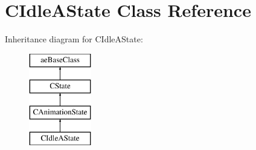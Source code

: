 \hypertarget{class_c_idle_a_state}{}\section{C\+Idle\+A\+State Class Reference}
\label{class_c_idle_a_state}
Inheritance diagram for C\+Idle\+A\+State\+:\begin{figure}[H]
\begin{center}
\leavevmode
\includegraphics[height=4.000000cm]{class_c_idle_a_state}
\end{center}
\end{figure}
